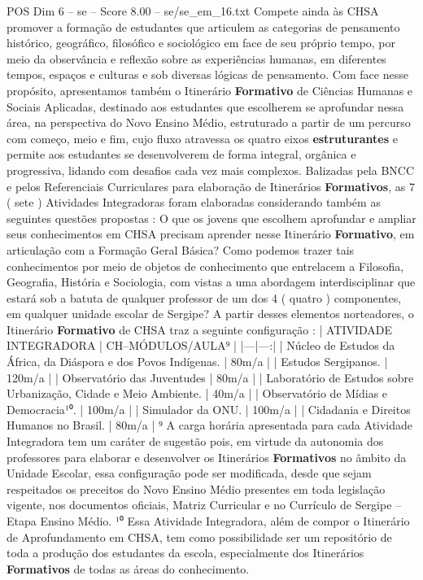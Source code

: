 \begin{textsample}{POS Dim 6 – se – Score 8.00 – se/se\_em\_16.txt}
Compete ainda às CHSA promover a formação de estudantes que articulem as categorias de pensamento histórico, geográfico, filosófico e sociológico em face de seu próprio tempo, por meio da observância e reflexão sobre as experiências humanas, em diferentes tempos, espaços e culturas e sob diversas lógicas de pensamento.
Com face nesse propósito, apresentamos também o Itinerário \textbf{Formativo} de Ciências Humanas e Sociais Aplicadas, destinado aos estudantes que escolherem se aprofundar nessa área, na perspectiva do Novo Ensino Médio, estruturado a partir de um percurso com começo, meio e fim, cujo fluxo atravessa os quatro eixos \textbf{estruturantes} e permite aos estudantes se desenvolverem de forma integral, orgânica e progressiva, lidando com desafios cada vez mais complexos.
Balizadas pela BNCC e pelos Referenciais Curriculares para elaboração de Itinerários \textbf{Formativos}, as 7 ( sete ) Atividades Integradoras foram elaboradas considerando também as seguintes questões propostas : O que os jovens que escolhem aprofundar e ampliar seus conhecimentos em CHSA precisam aprender nesse Itinerário \textbf{Formativo}, em articulação com a Formação Geral Básica?
Como podemos trazer tais conhecimentos por meio de objetos de conhecimento que entrelacem a Filosofia, Geografia, História e Sociologia, com vistas a uma abordagem interdisciplinar que estará sob a batuta de qualquer professor de um dos 4 ( quatro ) componentes, em qualquer unidade escolar de Sergipe?
A partir desses elementos norteadores, o Itinerário \textbf{Formativo} de CHSA traz a seguinte configuração : | ATIVIDADE INTEGRADORA | CH–MÓDULOS/AULA⁹ | |---|---:| | Núcleo de Estudos da África, da Diáspora e dos Povos Indígenas. | 80m/a | | Estudos Sergipanos. | 120m/a | | Observatório das Juventudes | 80m/a | | Laboratório de Estudos sobre Urbanização, Cidade e Meio Ambiente. | 40m/a | | Observatório de Mídias e Democracia¹⁰. | 100m/a | | Simulador da ONU. | 100m/a | | Cidadania e Direitos Humanos no Brasil. | 80m/a | ⁹ A carga horária apresentada para cada Atividade Integradora tem um caráter de sugestão pois, em virtude da autonomia dos professores para elaborar e desenvolver os Itinerários \textbf{Formativos} no âmbito da Unidade Escolar, essa configuração pode ser modificada, desde que sejam respeitados os preceitos do Novo Ensino Médio presentes em toda legislação vigente, nos documentos oficiais, Matriz Curricular e no Currículo de Sergipe – Etapa Ensino Médio. ¹⁰ Essa Atividade Integradora, além de compor o Itinerário de Aprofundamento em CHSA, tem como possibilidade ser um repositório de toda a produção dos estudantes da escola, especialmente dos Itinerários \textbf{Formativos} de todas as áreas do conhecimento.

\end{textsample}
